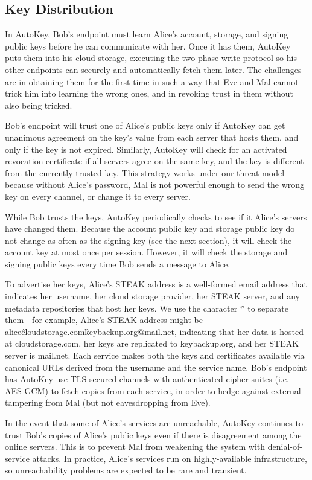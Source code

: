 \subsection{Key Distribution}
In AutoKey, Bob’s endpoint must learn Alice's account, storage, and signing public keys before he can communicate with her.  Once it has them, AutoKey puts them into his cloud storage, executing the two-phase write protocol so his other endpoints can securely and automatically fetch them later.  The challenges are in obtaining them for the first time in such a way that Eve and Mal cannot trick him into learning the wrong ones, and in revoking trust in them without also being tricked.

Bob’s endpoint will trust one of Alice’s public keys only if AutoKey can get unanimous agreement on the key’s value from each server that hosts them, and only if the key is not expired.  Similarly, AutoKey will check for an activated revocation certificate if all servers agree on the same key, and the key is different from the currently trusted key.  This strategy works under our threat model because without Alice’s password, Mal is not powerful enough to send the wrong key on every channel, or change it to every server.

While Bob trusts the keys, AutoKey periodically checks to see if it Alice’s servers have changed them.  Because the account public key and storage public key do not change as often as the signing key (see the next section), it will check the account key at most once per session.  However, it will check the storage and signing public keys every time Bob sends a message to Alice.

To advertise her keys, Alice’s STEAK address is a well-formed email address that indicates her username, her cloud storage provider, her STEAK server, and any metadata repositories that host her keys.  We use the character ‘\^’ to separate them---for example, Alice’s STEAK address might be alice\^cloudstorage.com\^keybackup.org@mail.net, indicating that her data is hosted at cloudstorage.com, her keys are replicated to keybackup.org, and her STEAK server is mail.net.  Each service makes both the keys and certificates available via canonical URLs derived from the username and the service name.  Bob’s endpoint has AutoKey use TLS-secured channels with authenticated cipher suites (i.e. AES-GCM) to fetch copies from each service, in order to hedge against external tampering from Mal (but not eavesdropping from Eve).

In the event that some of Alice’s services are unreachable, AutoKey continues to trust Bob’s copies of Alice’s public keys even if there is disagreement among the online servers.  This is to prevent Mal from weakening the system with denial-of-service attacks.  In practice, Alice’s services run on highly-available infrastructure, so unreachability problems are expected to be rare and transient.

